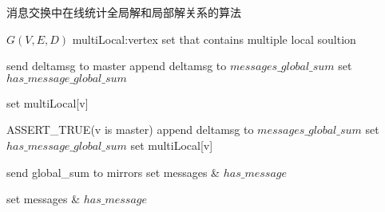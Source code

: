 \begin{algorithm}[!htbp]
  \small
  \caption{消息交换中在线统计全局解和局部解关系的算法}\label{alg:exchange_msg}
  \begin{algorithmic}[1] 
      \Require $G(V, E, D)$
      \Require multiLocal:\quad vertex set that contains multiple local soultion 

      \State send deltamsg to master
      \Else{}
      \State append deltamsg to $messages\_global\_sum$
      \State set $has\_message\_global\_sum$

      {\color{red}
      \State set multiLocal[v]
      \EndIf
      }

      \EndIf
      \EndFor

      \State ASSERT\_TRUE(v is master)
      \State append deltamsg to $messages\_global\_sum$
      \State set $has\_message\_global\_sum$
      {\color{red}
      \State set multiLocal[v]
      \EndIf
      }
      \EndFor


      \State send global\_sum to mirrors
      \State set messages \& $has\_message$
      \EndIf
      \EndFor

      \State set messages \& $has\_message$
      \EndFor
      \EndProcedure
    \end{algorithmic}
\end{algorithm}


